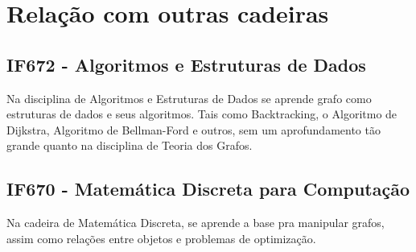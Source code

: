 \documentclass[a4paper,10pt]{article}
\begin{document}
\section{Relação com outras cadeiras}
\subsection{IF672 - Algoritmos e Estruturas de Dados}
Na disciplina de Algoritmos e Estruturas de Dados se aprende grafo como estruturas de dados e seus algoritmos. Tais como Backtracking\cite{wiki:xxc}, o Algoritmo de Dijkstra\cite{wiki:xxa}, Algoritmo de Bellman-Ford\cite{wiki:xxb} e outros, sem um aprofundamento tão grande quanto na disciplina de Teoria dos Grafos.
\subsection{IF670 - Matemática Discreta para Computação}
Na cadeira de Matemática Discreta, se aprende a base pra manipular grafos, assim como relações entre objetos e problemas de optimização.





\end{document}
